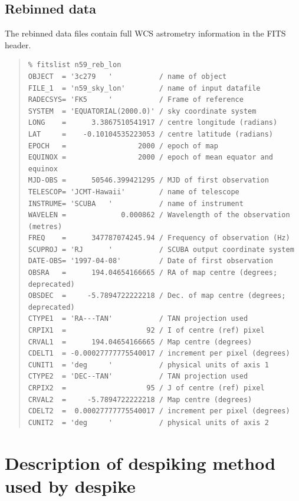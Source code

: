 \documentclass[twoside,11pt]{article}
\newcommand{\task}[1]{{\sf #1}}
\newenvironment{myquote}{\begin{quote}\begin{small}}{\end{small}\end{quote}}
\newcommand{\xlabel}[1]{}
\renewcommand{\_}{\texttt{\symbol{95}}}
\begin{document}
\subsection{Rebinned data}

The rebinned data files contain full WCS astrometry information \cite{WCS} in
the FITS header.

\begin{myquote}
\begin{verbatim}
% fitslist n59_reb_lon
OBJECT  = '3c279   '           / name of object
FILE_1  = 'n59_sky_lon'        / name of input datafile
RADECSYS= 'FK5     '           / Frame of reference
SYSTEM  = 'EQUATORIAL(2000.0)' / sky coordinate system
LONG    =      3.3867510541917 / centre longitude (radians)
LAT     =    -0.10104535223053 / centre latitude (radians)
EPOCH   =                 2000 / epoch of map
EQUINOX =                 2000 / epoch of mean equator and equinox
MJD-OBS =      50546.399421295 / MJD of first observation
TELESCOP= 'JCMT-Hawaii'        / name of telescope
INSTRUME= 'SCUBA   '           / name of instrument
WAVELEN =             0.000862 / Wavelength of the observation (metres)
FREQ    =      347787074245.94 / Frequency of observation (Hz)
SCUPROJ = 'RJ      '           / SCUBA output coordinate system
DATE-OBS= '1997-04-08'         / Date of first observation
OBSRA   =      194.04654166665 / RA of map centre (degrees; deprecated)
OBSDEC  =     -5.7894722222218 / Dec. of map centre (degrees; deprecated)
CTYPE1  = 'RA---TAN'           / TAN projection used
CRPIX1  =                   92 / I of centre (ref) pixel
CRVAL1  =      194.04654166665 / Map centre (degrees)
CDELT1  = -0.00027777775540017 / increment per pixel (degrees)
CUNIT1  = 'deg     '           / physical units of axis 1
CTYPE2  = 'DEC--TAN'           / TAN projection used
CRPIX2  =                   95 / J of centre (ref) pixel
CRVAL2  =     -5.7894722222218 / Map centre (degrees)
CDELT2  =  0.00027777775540017 / increment per pixel (degrees)
CUNIT2  = 'deg     '           / physical units of axis 2
\end{verbatim}
\end{myquote}


\section{\xlabel{despiking_eg}Description of despiking method used by \task{despike}\label{despiking_eg}}
\end{document}
